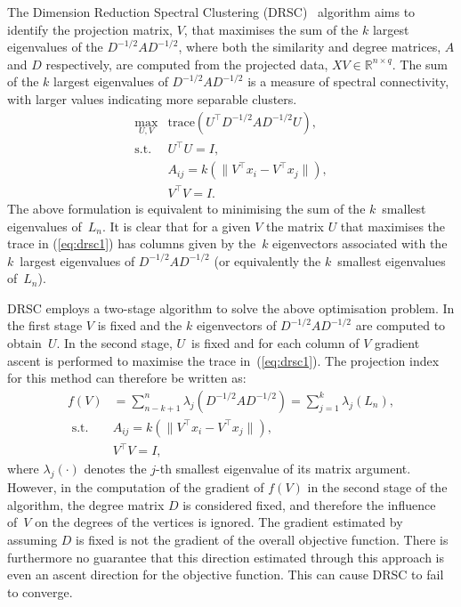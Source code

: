 \documentclass{book}
\def\R{\mathbb{R}}
\begin{document}
The Dimension Reduction Spectral Clustering (DRSC)~\cite{NiuDJ2011} algorithm
aims to identify the projection matrix, $V$, that maximises
the sum of the $k$ largest eigenvalues of the $D^{-1/2}AD^{-1/2}$,
where both the similarity and degree matrices, $A$ and $D$ respectively,
are computed from the projected data, $XV \in \R^{n \times q}$.
%
The sum of the $k$ largest eigenvalues of $D^{-1/2}AD^{-1/2}$ is a measure of
spectral connectivity, with larger values indicating more separable clusters.
%
\begin{eqnarray}
%
\max_{U, V} &  \mbox{trace}(U^\top D^{-1/2}AD^{-1/2}U), \label{eq:drsc1}\\
%	
\mathrm{s.t.} & U^\top U = I,\\
%
& A_{ij} = k(\|V^\top x_i - V^\top x_j \|), \label{eq:Aij}\\
%
&V^\top V = I.
%
\end{eqnarray}
%
The above formulation is equivalent to minimising the sum of the 
$k$~smallest eigenvalues of~$L_n$.
%
It is clear that
for a given $V$ the matrix $U$ that maximises the trace in (\ref{eq:drsc1}) has
columns given by the~$k$ eigenvectors associated with the $k$~largest
eigenvalues of $D^{-1/2}AD^{-1/2}$ (or equivalently the $k$~smallest
eigenvalues of~$L_n$).



DRSC employs a two-stage algorithm to solve the above optimisation problem.
In the first stage $V$ is fixed and the $k$ eigenvectors of $D^{-1/2}AD^{-1/2}$
are computed to obtain~$U$. In the second stage, $U$~is fixed and
for each column of $V$ gradient ascent is performed to maximise the trace
in~(\ref{eq:drsc1}). The projection index for this method can therefore be written as:
%
\begin{align*}
%
f(V) & = \sum^n_{n-k+1} \lambda_j \left( D^{-1/2}AD^{-1/2} \right) = \sum_{j=1}^k \lambda_j \left( L_n \right),\\
%
\textrm{ s.t. } & A_{ij} = k(\|V^\top x_i - V^\top x_j \|),\\
%
 & V^\top V = I,
\end{align*}
%
where $\lambda_j(\cdot)$ denotes the $j$-th smallest eigenvalue of 
its matrix argument.
%
However, in the computation of the gradient of $f(V)$ in the second stage of
the algorithm, the degree matrix $D$ is considered fixed, and therefore the
influence of~$V$ on the degrees of the vertices is ignored. The gradient
estimated by assuming $D$ is fixed is not the gradient of the overall objective
function. There is furthermore no guarantee that this direction estimated
through this approach is even an ascent direction for the objective function.
This can cause DRSC to fail to converge.
\end{document}
